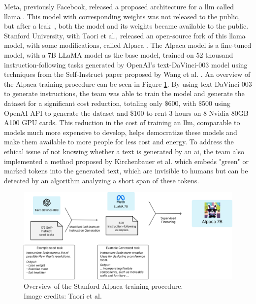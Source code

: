         Meta, previously Facebook, released a proposed architecture for a \gls{llm} called \gls{llama} \cite{touvronLLaMAOpenEfficient2023}. This model with corresponding weights was not released to the public, but after a leak \cite{vincentMetaPowerfulAI2023}, both the model and its weights became available to the public. Stanford University, with Taori et al., released an open-source fork of this \gls{llama} model, with some modifications, called Alpaca \cite{taoriStanfordCRFM, taoriStanfordAlpacaInstructionfollowing2023}. The Alpaca model is a fine-tuned model, with a 7B LLaMA model as the base model, trained on 52 thousand instruction-following tasks generated by OpenAI's text-DaVinci-003 model \cite{OpenAIAPI} using techniques from the Self-Instruct paper proposed by Wang et al. \cite{wangSelfInstructAligningLanguage2022}. An overview of the Alpaca training procedure can be seen in Figure \ref{fig:alpaca_training}. By using text-DaVinci-003 to generate instructions, the team was able to train the model  and generate the dataset for a significant cost reduction, totaling only \$600, with \$500 using OpenAI API to generate the dataset and \$100 to rent 3 hours on 8 Nvidia 80GB A100 GPU cards. This reduction in the cost of training an \gls{llm}, comparable to models much more expensive to develop, helps democratize these models and make them available to more people for less cost and energy.
        To address the ethical issue of not knowing whether a text is generated by an \gls{ai}, the team also implemented a method proposed by Kirchenbauer et al. \cite{kirchenbauerWatermarkLargeLanguage2023} which embeds "green" or marked tokens into the generated text, which are invisible to humans but can be detected by an algorithm analyzing a short span of these tokens.


        \begin{figure}[htb]
            \centerline{
            \includegraphics[width=17cm]{images/alpaca_framework.jpeg}}
            \caption[Overview of the Stanford Alpaca training procedure.]{Overview of the Stanford Alpaca training procedure.\\Image credits: Taori et al. \cite{taoriStanfordCRFM}}
            \label{fig:alpaca_training}
        \end{figure}


